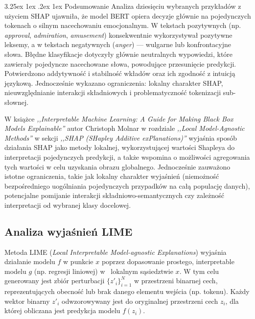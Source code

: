 \documentclass[wmii, inf, mgr]{uwmthesis}
\makeatletter
\renewcommand\paragraph{\@startsection{paragraph}{4}{\z@}%
  {3.25ex \@plus1ex \@minus.2ex}%
  {1ex}%
  {\normalfont\normalsize\bfseries}}
\makeatother
\begin{document}
\paragraph{Podsumowanie}
Analiza dziesięciu wybranych przykładów z użyciem SHAP ujawniła, że model BERT opiera decyzje głównie na pojedynczych tokenach o silnym nacechowaniu emocjonalnym. W tekstach pozytywnych (np. \textit{approval}, \textit{admiration}, \textit{amusement}) konsekwentnie wykorzystywał pozytywne leksemy, a w tekstach negatywnych (\textit{anger}) — wulgarne lub konfrontacyjne słowa. Błędne klasyfikacje dotyczyły głównie neutralnych wypowiedzi, które zawierały pojedyncze nacechowane słowa, powodujące przesunięcie predykcji. Potwierdzono addytywność i stabilność wkładów oraz ich zgodność z intuicją językową. Jednocześnie wykazano ograniczenia: lokalny charakter SHAP, nieuwzględnianie interakcji składniowych i problematyczność tokenizacji sub-słownej. 

W książce \textit{,,Interpretable Machine Learning: A Guide for Making Black Box Models Explainable''} \cite{SHAP} autor Christoph Molnar w rozdziale \textit{,,Local Model-Agnostic Methods''} w sekcji \textit{,,SHAP (SHapley Additive exPlanations)''} wyjaśnia sposób działania SHAP jako metody lokalnej, wykorzystującej wartości Shapleya do interpretacji pojedynczych predykcji, a także wspomina o możliwości agregowania tych wartości w celu uzyskania obrazu globalnego. Jednocześnie zauważono istotne ograniczenia, takie jak lokalny charakter wyjaśnień (niemożność bezpośredniego uogólniania pojedynczych przypadków na całą populację danych), potencjalne pomijanie interakcji składniowo-semantycznych czy zależność interpretacji od wybranej klasy docelowej.



\subsection{Analiza wyjaśnień LIME}
Metoda LIME (\textit{Local Interpretable Model-agnostic Explanations}) wyjaśnia działanie modelu $f$ w punkcie $x$ poprzez dopasowanie prostego, interpretable modelu $g$ (np. regresji liniowej) w~ lokalnym sąsiedztwie $x$. W tym celu generowany jest zbiór perturbacji $\{ z'_i \}_{i=1}^N$ w przestrzeni binarnej cech, reprezentujących obecność lub brak danego elementu wejścia (np. tokenu). Każdy wektor binarny $z'_i$ odwzorowywany jest do oryginalnej przestrzeni cech $z_i$, dla której obliczana jest predykcja modelu $f(z_i)$.
\end{document}
